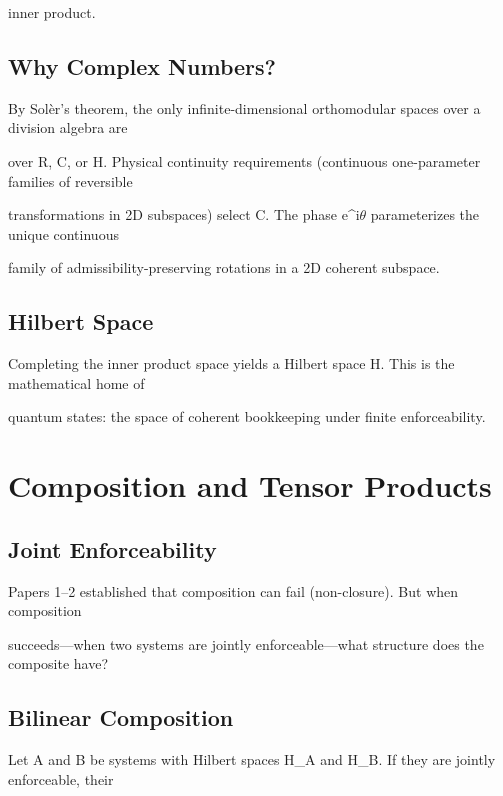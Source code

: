 \documentclass[11pt]{article}
\begin{document}
inner product.



\subsection{Why Complex Numbers?}

By Solèr’s theorem, the only infinite-dimensional orthomodular spaces over a division algebra are

over R, C, or H. Physical continuity requirements (continuous one-parameter families of reversible

transformations in 2D subspaces) select C. The phase e^{i$\theta$} parameterizes the unique continuous

family of admissibility-preserving rotations in a 2D coherent subspace.



\subsection{Hilbert Space}

Completing the inner product space yields a Hilbert space H. This is the mathematical home of

quantum states: the space of coherent bookkeeping under finite enforceability.



\section{Composition and Tensor Products}



\subsection{Joint Enforceability}

Papers 1--2 established that composition can fail (non-closure). But when composition

succeeds---when two systems are jointly enforceable---what structure does the composite have?



\subsection{Bilinear Composition}

Let A and B be systems with Hilbert spaces H_A and H_B. If they are jointly enforceable, their
\end{document}
